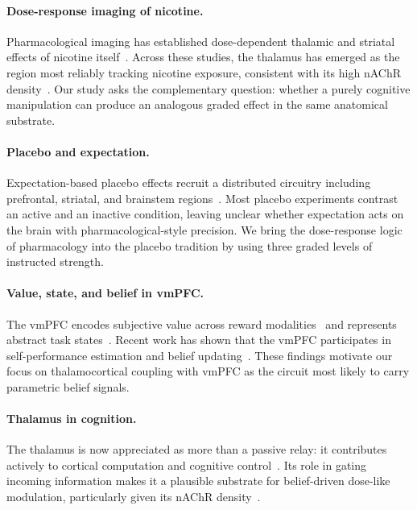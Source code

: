 \paragraph{Dose-response imaging of nicotine.} Pharmacological imaging has established dose-dependent thalamic and striatal effects of nicotine itself~\cite{brody2006cigarette,brody2011ventral,cosgrove2009beta2}. Across these studies, the thalamus has emerged as the region most reliably tracking nicotine exposure, consistent with its high nAChR density~\cite{picciotto2008nicotinic}. Our study asks the complementary question: whether a purely cognitive manipulation can produce an analogous graded effect in the same anatomical substrate.

\paragraph{Placebo and expectation.} Expectation-based placebo effects recruit a distributed circuitry including prefrontal, striatal, and brainstem regions~\cite{wager2004placebo,benedetti2013placebo}. Most placebo experiments contrast an active and an inactive condition, leaving unclear whether expectation acts on the brain with pharmacological-style precision. We bring the dose-response logic of pharmacology into the placebo tradition by using three graded levels of instructed strength.

\paragraph{Value, state, and belief in vmPFC.} The vmPFC encodes subjective value across reward modalities~\cite{plassmann2007orbitofrontal,levy2012root} and represents abstract task states~\cite{wilson2014orbitofrontal,schuck2016human}. Recent work has shown that the vmPFC participates in self-performance estimation and belief updating~\cite{rouault2018belief,rouault2022prefrontal}. These findings motivate our focus on thalamocortical coupling with vmPFC as the circuit most likely to carry parametric belief signals.

\paragraph{Thalamus in cognition.} The thalamus is now appreciated as more than a passive relay: it contributes actively to cortical computation and cognitive control~\cite{sherman2016thalamus,halassa2017thalamic}. Its role in gating incoming information makes it a plausible substrate for belief-driven dose-like modulation, particularly given its nAChR density~\cite{picciotto2008nicotinic}.

